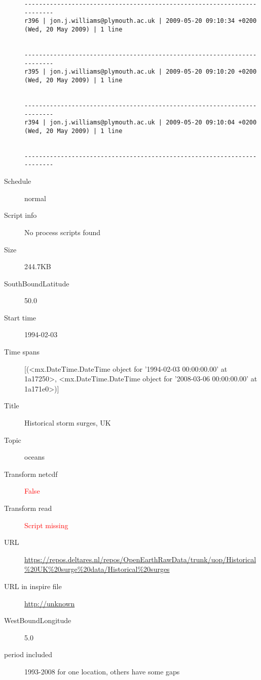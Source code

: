 \documentclass[9]{report}
\begin{document}
\begin{description}
\begin{verbatim}
------------------------------------------------------------------------
r396 | jon.j.williams@plymouth.ac.uk | 2009-05-20 09:10:34 +0200 (Wed, 20 May 2009) | 1 line


------------------------------------------------------------------------
r395 | jon.j.williams@plymouth.ac.uk | 2009-05-20 09:10:20 +0200 (Wed, 20 May 2009) | 1 line


------------------------------------------------------------------------
r394 | jon.j.williams@plymouth.ac.uk | 2009-05-20 09:10:04 +0200 (Wed, 20 May 2009) | 1 line


------------------------------------------------------------------------

\end{verbatim}
  \item[Schedule] normal
  \item[Script info] No process scripts found
  \item[Size] 244.7KB
  \item[SouthBoundLatitude] 50.0
  \item[Start time] 1994-02-03
  \item[Time spans] [(<mx.DateTime.DateTime object for '1994-02-03 00:00:00.00' at 1a17250>, <mx.DateTime.DateTime object for '2008-03-06 00:00:00.00' at 1a171e0>)]
  \item[Title]  Historical storm surges, UK 
  \item[Topic] oceans
  \item[Transform netcdf] \textcolor{red}{False}
  \item[Transform read] \textcolor{red}{Script missing}
  \item[URL] \href{https://repos.deltares.nl/repos/OpenEarthRawData/trunk/uop/Historical\%20UK\%20surge\%20data/Historical\%20surges}{https://repos.deltares.nl/repos/OpenEarthRawData/trunk/uop/Historical\%20UK\%20surge\%20data/Historical\%20surges}
  \item[URL in inspire file] \href{http://unknown}{http://unknown}
  \item[WestBoundLongitude] 5.0
  \item[period included] 1993-2008 for one location, others have some gaps
\end{description}
\end{document}
